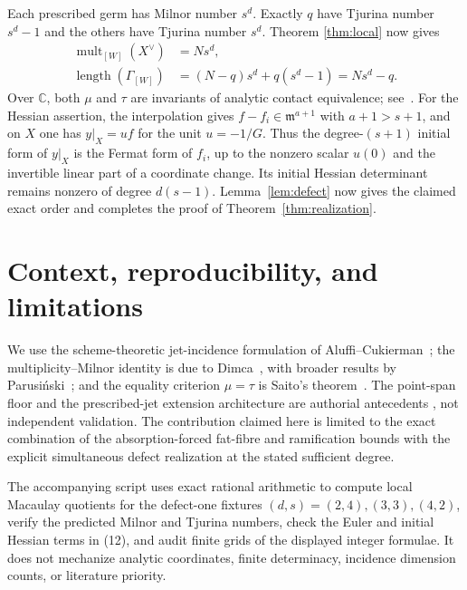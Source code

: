 \documentclass[11pt,a4paper]{article}
\theoremstyle{definition}
\newcommand{\kk}{\mathbb C}
\newcommand{\m}{\mathfrak m}
\newcommand{\mult}{\operatorname{mult}}
\newcommand{\length}{\operatorname{length}}
\begin{document}
Each prescribed germ has Milnor number $s^d$.  Exactly $q$ have Tjurina
number $s^d-1$ and the others have Tjurina number $s^d$.  Theorem
\ref{thm:local} now gives
\begin{align*}
 \mult_{[W]}(X^\vee)&=Ns^d,\\
 \length(\Gamma_{[W]})&=(N-q)s^d+q(s^d-1)=Ns^d-q.
\end{align*}
Over $\kk$, both $\mu$ and $\tau$ are invariants of analytic contact
equivalence; see~\cite[Section~2.2]{GreuelLossenShustin2007}.  For the
Hessian assertion, the interpolation gives
$f-f_i\in\m^{a+1}$ with $a+1>s+1$, and on $X$ one has $y|_X=uf$ for the unit
$u=-1/G$.  Thus the degree-$(s+1)$ initial form of $y|_X$ is the Fermat form
of $f_i$, up to the nonzero scalar $u(0)$ and the invertible linear part of a
coordinate change.  Its initial Hessian determinant remains nonzero of
degree $d(s-1)$.  Lemma~\ref{lem:defect} now gives the claimed exact order
and completes the proof of Theorem~\ref{thm:realization}.

\section{Context, reproducibility, and limitations}

We use the scheme-theoretic jet-incidence formulation of
Aluffi--Cukierman~\cite{AluffiCukierman1993}; the multiplicity--Milnor
identity is due to Dimca~\cite{Dimca1986}, with broader results by
Parusi\'nski~\cite{Parusinski1991}; and the equality criterion
$\mu=\tau$ is Saito's theorem~\cite{Saito1971}.  The point-span floor and the
prescribed-jet extension architecture are authorial antecedents
\cite{ErikssonTangent2026,ErikssonOsculating2026,ErikssonDual2026}, not
independent validation.  The contribution claimed here is limited to the
exact combination of the absorption-forced fat-fibre and ramification bounds
with the explicit simultaneous defect realization at the stated sufficient
degree.

The accompanying script uses exact rational arithmetic to compute local
Macaulay quotients for the defect-one fixtures $(d,s)=(2,4),(3,3),(4,2)$,
verify the predicted Milnor and Tjurina numbers, check the Euler and initial
Hessian terms in (12), and audit finite grids of the displayed integer
formulae.  It does not mechanize analytic coordinates, finite determinacy,
incidence dimension counts, or literature priority.
\end{document}
